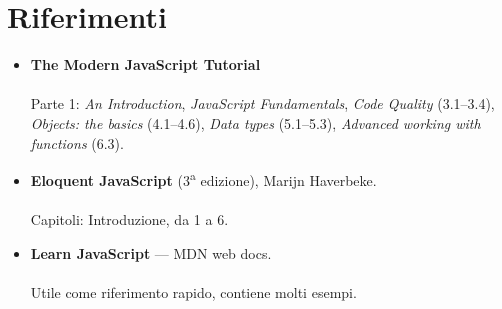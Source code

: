 \section{Riferimenti}

\begin{itemize}
  \item \textbf{The Modern JavaScript Tutorial} \\
         \\
        Parte 1: \textit{An Introduction}, \textit{JavaScript Fundamentals},
        \textit{Code Quality} (3.1--3.4), \textit{Objects: the basics}
        (4.1--4.6), \textit{Data types} (5.1--5.3),
        \textit{Advanced working with functions} (6.3).
  \item \textbf{Eloquent JavaScript} (3\textsuperscript{a} edizione), Marijn
        Haverbeke. \\
         \\
        Capitoli: Introduzione, da 1 a 6.
  \item \textbf{Learn JavaScript} --- MDN web docs. \\
         \\
        Utile come riferimento rapido, contiene molti esempi.
\end{itemize}
